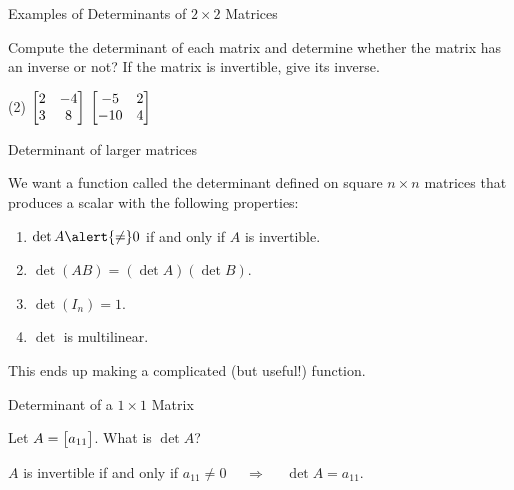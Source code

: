 \documentclass[xcolor=dvipsnames,aspectratio=169,t]{beamer}
\begin{document}
\begin{frame}{Examples of Determinants of $2 \times 2$ Matrices}

Compute the determinant of each matrix and determine whether the matrix has an inverse or not? If the matrix is invertible, give its inverse.
\medskip

  \begin{tasks}(2)
    \task $\displaystyle \begin{bmatrix} 2 & -4 \\ 3 & 8 \end{bmatrix}$
    \task $\displaystyle \begin{bmatrix} -5 & 2 \\ -10 & 4 \end{bmatrix}$
\end{tasks}

\vspace{3in}

\end{frame}


\begin{frame}{Determinant of larger matrices}
  
  We want a function called the \alert{determinant} defined on square $n\times n$ matrices that produces a scalar
  with the following properties:
  \medskip
  
  \begin{enumerate}
    \item $\det A \alert{\ne} 0$ if and only if $A$ is \alert{invertible}.
    \smallskip
    \pause%
    \item $\det(AB)=(\det A)(\det B)$.\smallskip
    \item $\det(I_n)=1$.\smallskip
    \item $\det$ is multilinear.\smallskip
  \end{enumerate}
  \bigskip
  
  This ends up making a complicated (\alert{but useful!}) function.
\end{frame}


\begin{frame}{Determinant of a $1 \times 1$ Matrix}
\bigskip

  Let $\displaystyle A = \begin{bmatrix} a_{11} \end{bmatrix}$.  What is $\det A$?
  \bigskip

  \pause
  $A$ is invertible if and only if $a_{11}\ne 0$ \alert{$\quad\Rightarrow\quad$} $\det A=a_{11}$.
\end{frame}
\end{document}
